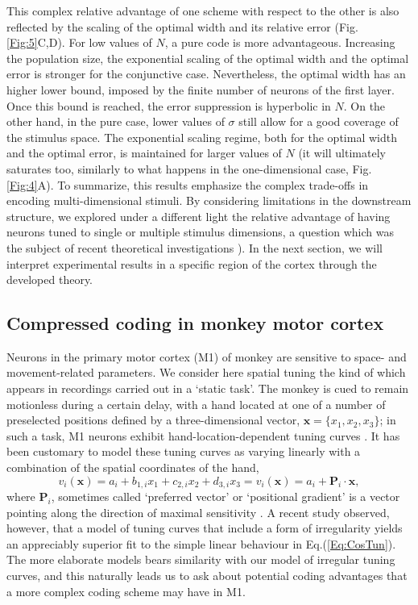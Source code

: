 \documentclass[a4paper]{article}%
\begin{document}
This complex relative advantage of one scheme with respect to the other is also reflected by the scaling of the optimal width and its relative error (Fig. \ref{Fig:5}C,D). For low values of $N$, a pure code is more advantageous. Increasing the population size, the exponential scaling of the optimal width and the optimal error is stronger for the conjunctive case. Nevertheless, the optimal width has an higher lower bound, imposed by the finite number of neurons of the first layer. Once this bound is reached, the error suppression is hyperbolic in $N$. On the other hand, in the pure case, lower values of $\sigma$ still allow for a good coverage of the stimulus space. The exponential scaling regime, both for the optimal width and the optimal error, is maintained for larger values of $N$ (it will ultimately saturates too, similarly to what happens in the one-dimensional case, Fig. \ref{Fig:4}A).
To summarize, this results emphasize the complex trade-offs in encoding multi-dimensional stimuli. By considering limitations in the downstream structure, we explored under a different light the relative advantage of having neurons tuned to single or multiple stimulus dimensions,  a question which was the subject of recent theoretical investigations  \cite[]{Finkelstein2018OptimalBats,Harel2020OptimalConstraints}). In the next section, we will interpret experimental results in a specific region of the cortex through the developed theory.

\subsection{Compressed coding in monkey motor cortex}

Neurons in the primary motor cortex (M1) of monkey are sensitive to space- and
movement-related parameters. We consider here spatial tuning the kind of which
appears in recordings carried out in a `static task'. The monkey is cued to
remain motionless during a certain delay, with a hand located at one of a
number of preselected positions defined by a three-dimensional vector,
$\mathbf{x}=\{x_{1},x_{2},x_{3}\}$; in such a task, M1 neurons exhibit
hand-location-dependent tuning curves
\cite[]{Kettner1988PrimateOrigins,Wang2007MotorReaching}. It has been customary to model these
tuning curves as varying linearly with a combination of the spatial
coordinates of the hand,
\begin{equation}
v_{i}(\mathbf{x})=a_{i}+b_{1,i}x_{1}+c_{2,i}x_{2}+d_{3,i}x_{3}=v_{i}
(\mathbf{x})=a_{i}+\mathbf{P}_{i}\cdot\mathbf{x},
\label{Eq:CosTun}
\end{equation}
where $\mathbf{P}_{i}$, sometimes called `preferred vector' or `positional
gradient'  is a vector pointing along the direction of maximal
sensitivity \cite[]{Wang2007MotorReaching}. A recent study
\cite[]{Lalazar2016TuningConnectivity} observed, however, that a model of tuning
curves that include a form of irregularity yields an appreciably superior fit
to the simple linear behaviour in Eq.(\ref{Eq:CosTun}). The more elaborate
models bears similarity with our model of irregular tuning curves, and this
naturally leads us to ask about potential coding advantages that a more
complex coding scheme may have in M1.
\end{document}
